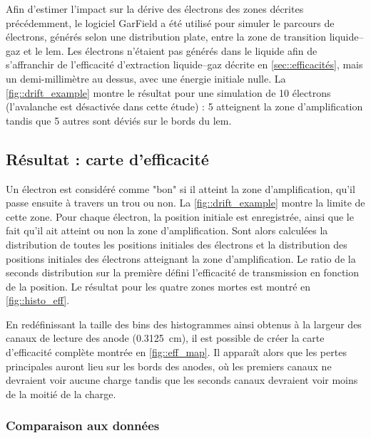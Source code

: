                Afin d'estimer l'impact sur la dérive des électrons des zones décrites précédemment, le logiciel GarField \cite{garfield} a été utilisé pour simuler le parcours de  électrons, générés selon une distribution plate, entre la zone de transition liquide--gaz et le \gls{lem}. Les électrons n'étaient pas générés dans le liquide afin de s'affranchir de l'efficacité d'extraction liquide--gaz décrite en \autoref{sec::efficacités}, mais un demi-millimètre au dessus, avec une énergie initiale nulle. La \autoref{fig::drift_example} %
                montre le résultat pour une simulation de 10 électrons (l'avalanche est désactivée dans cette étude) : 5  atteignent la zone d'amplification tandis que 5 autres sont déviés sur le bords du \gls{lem}.
                
        \subsection{Résultat : carte d'efficacité}
            
            Un électron est considéré comme "bon" si il atteint la zone d'amplification, qu'il passe ensuite à travers un trou ou non. La \autoref{fig::drift_example} montre la limite de cette zone. Pour chaque électron, la position initiale est enregistrée, ainsi que le fait qu'il ait atteint ou non la zone d'amplification. Sont alors calculées la distribution de toutes les positions initiales des électrons et la distribution des positions initiales des électrons atteignant la zone d'amplification. Le ratio de la seconds distribution sur la première défini l'efficacité de transmission en fonction de la position. Le résultat pour les quatre zones mortes est montré en \autoref{fig::histo_eff}.
            
            En redéfinissant la taille des bins des histogrammes ainsi obtenus à la largeur des canaux de lecture des anode (\SI{0.3125}{\centi\meter}), il est possible de créer la carte d'efficacité complète montrée en \autoref{fig::eff_map}. Il apparaît alors que les pertes principales auront lieu sur les bords des anodes, où les premiers canaux ne devraient voir aucune charge tandis que les seconds canaux devraient voir moins de la moitié de la charge.
            
            \subsubsection{Comparaison aux données}
            
